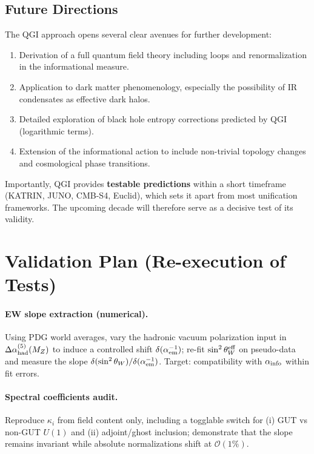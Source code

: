 \documentclass{article}
\numberwithin{equation}{section}
\theoremstyle{plain}
\theoremstyle{definition}
\theoremstyle{remark}
\begin{document}
\subsection{Future Directions}
The QGI approach opens several clear avenues for further development:
\begin{enumerate}
    \item Derivation of a full quantum field theory including loops and renormalization in the informational measure.
    \item Application to dark matter phenomenology, especially the possibility of IR condensates as effective dark halos.
    \item Detailed exploration of black hole entropy corrections predicted by QGI (logarithmic terms).
    \item Extension of the informational action to include non-trivial topology changes and cosmological phase transitions.
\end{enumerate}

Importantly, QGI provides \textbf{testable predictions} within a short timeframe (KATRIN, JUNO, CMB-S4, Euclid), which sets it apart from most unification frameworks. 
The upcoming decade will therefore serve as a decisive test of its validity.


\section{Validation Plan (Re-execution of Tests)}
\label{sec:validation}

\paragraph{EW slope extraction (numerical).}
Using PDG world averages, vary the hadronic vacuum polarization input in $\Delta\alpha^{(5)}_{\rm had}(M_Z)$ to induce a controlled shift $\delta(\alpha_{\rm em}^{-1})$; re-fit $\sin^2\theta_W^{\rm eff}$ on pseudo-data and measure the slope $\delta(\sin^2\theta_W)/\delta(\alpha_{\rm em}^{-1})$. Target: compatibility with $\alpha_{\rm info}$ within fit errors.

\paragraph{Spectral coefficients audit.}
Reproduce $\kappa_i$ from field content only, including a togglable switch for (i) GUT vs non-GUT $U(1)$ and (ii) adjoint/ghost inclusion; demonstrate that the slope remains invariant while absolute normalizations shift at $\mathcal{O}(1\%)$.
\end{document}
